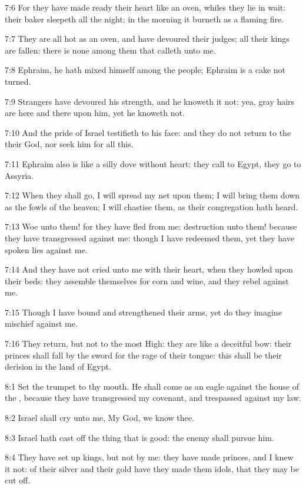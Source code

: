 7:6 For they have made ready their heart like an oven, whiles they lie
in wait: their baker sleepeth all the night; in the morning it burneth
as a flaming fire.

7:7 They are all hot as an oven, and have devoured their judges; all
their kings are fallen: there is none among them that calleth unto me.

7:8 Ephraim, he hath mixed himself among the people; Ephraim is a cake
not turned.

7:9 Strangers have devoured his strength, and he knoweth it not: yea,
gray hairs are here and there upon him, yet he knoweth not.

7:10 And the pride of Israel testifieth to his face: and they do not
return to the \LORD their God, nor seek him for all this.

7:11 Ephraim also is like a silly dove without heart: they call to
Egypt, they go to Assyria.

7:12 When they shall go, I will spread my net upon them; I will bring
them down as the fowls of the heaven; I will chastise them, as their
congregation hath heard.

7:13 Woe unto them! for they have fled from me: destruction unto them!
because they have transgressed against me: though I have redeemed
them, yet they have spoken lies against me.

7:14 And they have not cried unto me with their heart, when they
howled upon their beds: they assemble themselves for corn and wine,
and they rebel against me.

7:15 Though I have bound and strengthened their arms, yet do they
imagine mischief against me.

7:16 They return, but not to the most High: they are like a deceitful
bow: their princes shall fall by the sword for the rage of their
tongue: this shall be their derision in the land of Egypt.

8:1 Set the trumpet to thy mouth. He shall come as an eagle against
the house of the \LORD, because they have transgressed my covenant, and
trespassed against my law.

8:2 Israel shall cry unto me, My God, we know thee.

8:3 Israel hath cast off the thing that is good: the enemy shall
pursue him.

8:4 They have set up kings, but not by me: they have made princes, and
I knew it not: of their silver and their gold have they made them
idols, that they may be cut off.

